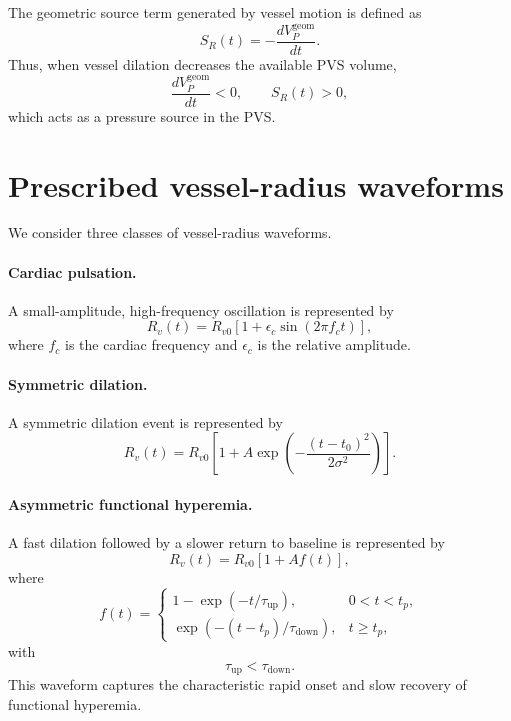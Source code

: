 \documentclass{article}
\begin{document}
The geometric source term generated by vessel motion is defined as
\begin{equation}
    S_R(t)
    =
    -\frac{dV_P^{\mathrm{geom}}}{dt}.
\end{equation}
Thus, when vessel dilation decreases the available PVS volume,
\[
    \frac{dV_P^{\mathrm{geom}}}{dt}<0,
    \qquad
    S_R(t)>0,
\]
which acts as a pressure source in the PVS.


\section{Prescribed vessel-radius waveforms}

We consider three classes of vessel-radius waveforms.

\paragraph{Cardiac pulsation.}
A small-amplitude, high-frequency oscillation is represented by
\begin{equation}
    R_v(t)
    =
    R_{v0}
    \left[
    1+\epsilon_c \sin(2\pi f_c t)
    \right],
\end{equation}
where \(f_c\) is the cardiac frequency and \(\epsilon_c\) is the relative amplitude.

\paragraph{Symmetric dilation.}
A symmetric dilation event is represented by
\begin{equation}
    R_v(t)
    =
    R_{v0}
    \left[
    1+
    A\exp\left(-\frac{(t-t_0)^2}{2\sigma^2}\right)
    \right].
\end{equation}

\paragraph{Asymmetric functional hyperemia.}
A fast dilation followed by a slower return to baseline is represented by
\begin{equation}
    R_v(t)
    =
    R_{v0}
    \left[
    1+A f(t)
    \right],
\end{equation}
where
\begin{equation}
    f(t)
    =
    \begin{cases}
    1-\exp(-t/\tau_{\mathrm{up}}), & 0<t<t_p, \\[4pt]
    \exp(-(t-t_p)/\tau_{\mathrm{down}}), & t\geq t_p,
    \end{cases}
\end{equation}
with
\[
    \tau_{\mathrm{up}}<\tau_{\mathrm{down}}.
\]
This waveform captures the characteristic rapid onset and slow recovery of functional hyperemia.
\end{document}
